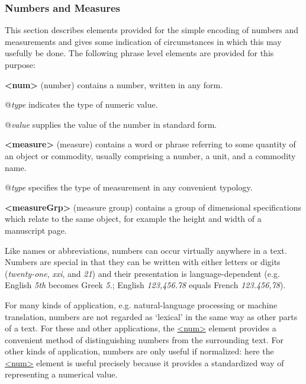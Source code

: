 \subsubsection[{Numbers and Measures}]{Numbers and Measures}\label{CONANU}\par
This section describes elements provided for the simple encoding of numbers and measurements and gives some indication of circumstances in which this may usefully be done. The following phrase level elements are provided for this purpose: 
\begin{sansreflist}
  
\item [\textbf{<num>}] (number) contains a number, written in any form.\hfil\\[-10pt]\begin{sansreflist}
    \item[@{\itshape type}]
  indicates the type of numeric value.
    \item[@{\itshape value}]
  supplies the value of the number in standard form.
\end{sansreflist}  
\item [\textbf{<measure>}] (measure) contains a word or phrase referring to some quantity of an object or commodity, usually comprising a number, a unit, and a commodity name.\hfil\\[-10pt]\begin{sansreflist}
    \item[@{\itshape type}]
  specifies the type of measurement in any convenient typology.
\end{sansreflist}  
\item [\textbf{<measureGrp>}] (measure group) contains a group of dimensional specifications which relate to the same object, for example the height and width of a manuscript page.
\end{sansreflist}
\par
Like names or abbreviations, numbers can occur virtually anywhere in a text. Numbers are special in that they can be written with either letters or digits (\textit{twenty-one}, \textit{xxi}, and \textit{21}) and their presentation is language-dependent (e.g. English \textit{5th} becomes Greek \textit{5.}; English \textit{123,456.78} equals French \textit{123.456,78}).\par
For many kinds of application, e.g. natural-language processing or machine translation, numbers are not regarded as ‘lexical’ in the same way as other parts of a text. For these and other applications, the \hyperref[TEI.num]{<num>} element provides a convenient method of distinguishing numbers from the surrounding text. For other kinds of application, numbers are only useful if normalized: here the \hyperref[TEI.num]{<num>} element is useful precisely because it provides a standardized way of representing a numerical value.\par
